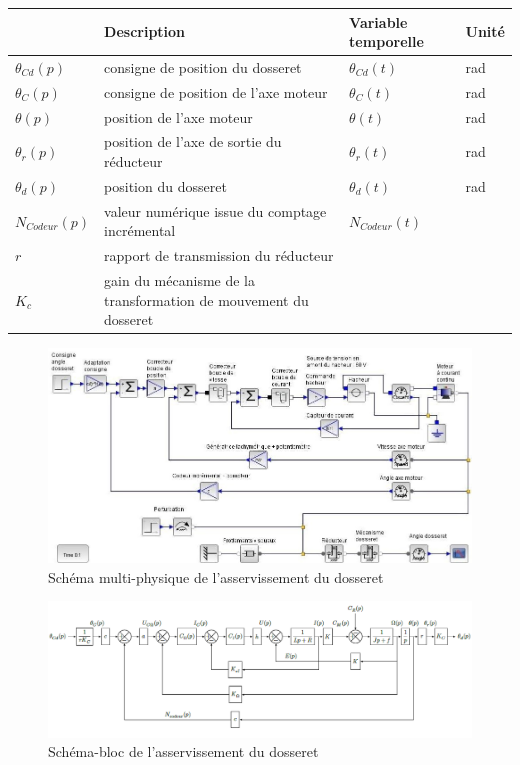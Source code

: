 \begin{tabular}{|p{2cm}|p{7cm}|p{2cm}|p{2cm}|}
\hline
 & \textbf{Description} & \textbf{Variable temporelle} & \textbf{Unité} \\
\hline
$\theta_{Cd}(p)$ & consigne de position du dosseret	& $\theta_{Cd}(t)$ & rad \\
\hline
$\theta_{C}(p)$ & consigne de position de l'axe moteur & $\theta_{C}(t)$ & rad \\
\hline
$\theta(p)$ & position de l'axe moteur & $\theta(t)$ & rad \\
\hline
$\theta_{r}(p)$ & position de l'axe de sortie du réducteur & $\theta_{r}(t)$ & rad \\
\hline
$\theta_{d}(p)$ & position du dosseret & $\theta_{d}(t)$ & rad \\
\hline
$N_{Codeur}(p)$ & valeur numérique issue du comptage incrémental & $N_{Codeur}(t)$ & 	 \\
\hline
$r$ & rapport de transmission du réducteur & &  \\
\hline
$K_{c}$ & gain du mécanisme  de la transformation de mouvement du dosseret & &  \\
\hline
\end{tabular}

\begin{figure}[!ht]
\begin{center}
 \includegraphics[width=\linewidth]{img/img06}
\end{center}
\caption{Schéma multi-physique  de l'asservissement du dosseret}
\label{fig5}
\end{figure}

\begin{figure}[!ht]
\begin{center}
 \includegraphics[width=\linewidth]{img/img07}
\end{center}
\caption{Schéma-bloc de l'asservissement du dosseret}
\label{fig6}
\end{figure}

